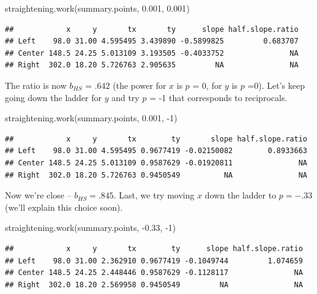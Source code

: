 \documentclass[
]{book}
\newenvironment{Shaded}{\begin{snugshade}}{\end{snugshade}}
\newcommand{\DecValTok}[1]{\textcolor[rgb]{0.00,0.00,0.81}{#1}}
\newcommand{\FloatTok}[1]{\textcolor[rgb]{0.00,0.00,0.81}{#1}}
\newcommand{\FunctionTok}[1]{\textcolor[rgb]{0.00,0.00,0.00}{#1}}
\newcommand{\NormalTok}[1]{#1}
\newcommand{\SpecialCharTok}[1]{\textcolor[rgb]{0.00,0.00,0.00}{#1}}
\begin{document}
\begin{Shaded}
\begin{Highlighting}[]
\FunctionTok{straightening.work}\NormalTok{(summary.points, }\FloatTok{0.001}\NormalTok{, }\FloatTok{0.001}\NormalTok{)}
\end{Highlighting}
\end{Shaded}

\begin{verbatim}
##            x     y       tx       ty      slope half.slope.ratio
## Left    98.0 31.00 4.595495 3.439890 -0.5899825         0.683707
## Center 148.5 24.25 5.013109 3.193505 -0.4033752               NA
## Right  302.0 18.20 5.726763 2.905635         NA               NA
\end{verbatim}

The ratio is now \(b_{HS}\) = .642 (the power for \(x\) is \(p\) = 0, for \(y\) is \(p\) =0). Let's keep going down the ladder for \(y\) and try \(p\) = -1 that corresponds to reciprocals.

\begin{Shaded}
\begin{Highlighting}[]
\FunctionTok{straightening.work}\NormalTok{(summary.points, }\FloatTok{0.001}\NormalTok{, }\SpecialCharTok{{-}}\DecValTok{1}\NormalTok{)}
\end{Highlighting}
\end{Shaded}

\begin{verbatim}
##            x     y       tx        ty       slope half.slope.ratio
## Left    98.0 31.00 4.595495 0.9677419 -0.02150082        0.8933663
## Center 148.5 24.25 5.013109 0.9587629 -0.01920811               NA
## Right  302.0 18.20 5.726763 0.9450549          NA               NA
\end{verbatim}

Now we're close -- \(b_{HS} = .845\). Last, we try moving \(x\) down the ladder to \(p = -.33\) (we'll explain this choice soon).

\begin{Shaded}
\begin{Highlighting}[]
\FunctionTok{straightening.work}\NormalTok{(summary.points, }\SpecialCharTok{{-}}\FloatTok{0.33}\NormalTok{, }\SpecialCharTok{{-}}\DecValTok{1}\NormalTok{)}
\end{Highlighting}
\end{Shaded}

\begin{verbatim}
##            x     y       tx        ty      slope half.slope.ratio
## Left    98.0 31.00 2.362910 0.9677419 -0.1049744         1.074659
## Center 148.5 24.25 2.448446 0.9587629 -0.1128117               NA
## Right  302.0 18.20 2.569958 0.9450549         NA               NA
\end{verbatim}
\end{document}
